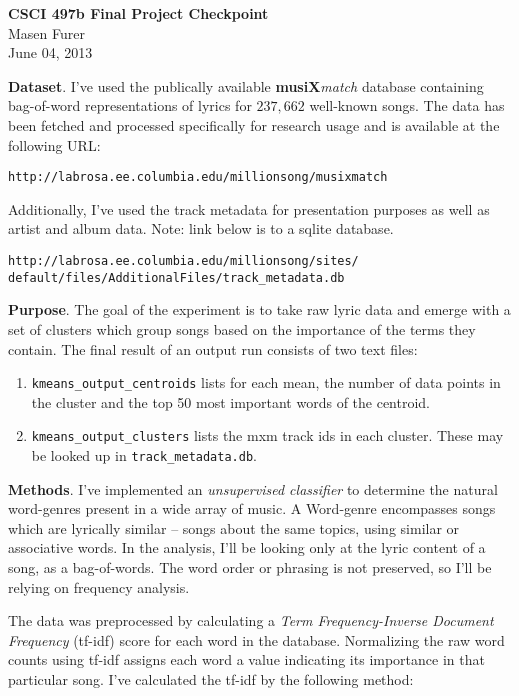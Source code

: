 \documentclass[11pt]{article}
\begin{document}
\begin{center}
\textbf{CSCI 497b Final Project Checkpoint} \\
Masen Furer\\
June 04, 2013\\
\end{center}

\textbf{Dataset}. I've used the publically available \textbf{musiX}\emph{match} 
database containing bag-of-word representations of lyrics for $237,662$ well-known
songs. The data has been fetched and processed specifically for research usage and
is available at the following URL:

\verb|http://labrosa.ee.columbia.edu/millionsong/musixmatch|

Additionally, I've used the track metadata for presentation purposes as
well as artist and album data. Note: link below is to a sqlite database.

\begin{verbatim}http://labrosa.ee.columbia.edu/millionsong/sites/
default/files/AdditionalFiles/track_metadata.db\end{verbatim}

\textbf{Purpose}. The goal of the experiment is to take raw lyric data
and emerge with a set of clusters which group songs based on the
importance of the terms they contain. The final result of an output run
consists of two text files:

\begin{enumerate}
    \item \verb|kmeans_output_centroids| lists for each mean, the number of data points
    in the cluster and the top 50 most important words of the centroid.
    \item \verb|kmeans_output_clusters| lists the mxm track ids in each cluster. These
    may be looked up in \verb|track_metadata.db|.
\end{enumerate}

\textbf{Methods}. I've implemented an \emph{unsupervised classifier} to determine
the natural word-genres present in a wide array of music. A Word-genre encompasses
songs which are lyrically similar -- songs about the same topics, using similar
or associative words. In the analysis, I'll be looking only at the lyric content
of a song, as a bag-of-words. The word order or phrasing is not preserved, so 
I'll be relying on frequency analysis.

The data was preprocessed by calculating a \emph{Term Frequency-Inverse Document Frequency}
(tf-idf) score for each word in the database. Normalizing the raw word counts using
tf-idf assigns each word a value indicating its importance in that particular song.
I've calculated the tf-idf by the following method:
\end{document}
